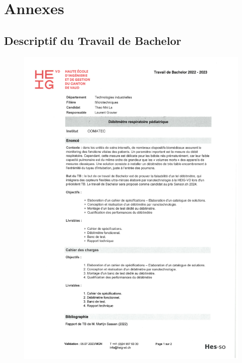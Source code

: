 \documentclass[
    iai & comatec, %
    mi, %
]{heig-tb}
\begin{document}
\clearpage

\printbibliography

\appendix
\appendixpage
\addappheadtotoc

\chapter{Annexes}

\section{Descriptif du Travail de Bachelor}
\begin{figure}[H]
    \vspace*{-2cm} \hspace{-1cm}
    \includegraphics[scale = 0.8, page = 1]{assets/pdf/descriptif_TB.pdf}
\end{figure}

\end{document}
